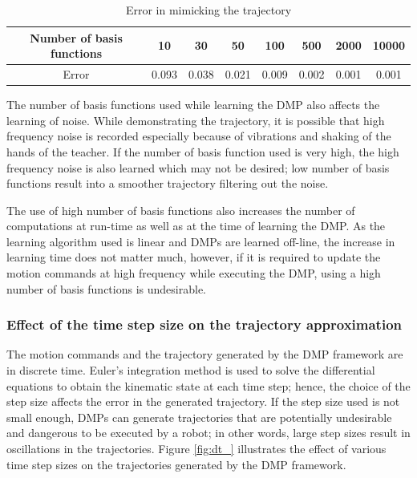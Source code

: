 \begin{center}
	\begin{table}[H]
		\begin{tabular}{| c | c | c | c | c | c | c | c |}	
			\hline
			Number of basis functions & 10 & 30 & 50 & 100 & 500 & 2000 & 10000\\       
			\hline
			Error & 0.093 & 0.038 & 0.021 & 0.009 & 0.002 & 0.001 & 0.001\\
			\hline
		\end{tabular}
		\caption{Error in mimicking the trajectory}
	\end{table}\label{_n_bfs_e}
\end{center}



The number of basis functions used while learning the DMP also affects the learning of noise. While demonstrating the trajectory, it is possible that high frequency noise is recorded especially because of vibrations and shaking of the hands of the teacher. If the number of basis function used is very high, the high frequency noise is also learned which may not be desired; low number of basis functions result into a smoother trajectory filtering out the noise. 

The use of high number of basis functions also increases the number of computations at run-time as well as at the time of learning the DMP. As the learning algorithm used is linear and DMPs are learned off-line, the increase in learning time does not matter much, however, if it is required to update the motion commands at high frequency while executing the DMP, using a high number of basis functions is undesirable.     

\subsubsection{Effect of the time step size on the trajectory approximation}   
The motion commands and the trajectory generated by the DMP framework are in discrete time. Euler's integration method is used to solve the differential equations to obtain the kinematic state at each time step; hence, the choice of the step size affects the error in the generated trajectory. If the step size used is not small enough, DMPs can generate trajectories that are potentially undesirable and dangerous to be executed by a robot; in other words, large step sizes result in oscillations in the trajectories. Figure \ref{fig:dt_} illustrates the effect of various time step sizes on the trajectories generated by the DMP framework. 

